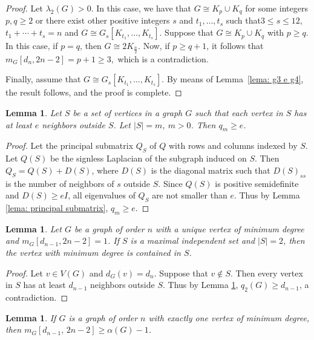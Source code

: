 \documentclass[preprint,12pt]{elsarticle}
\newtheorem{lemma}[theorem]{Lemma}
\begin{document}
\begin{proof}
Let $\lambda_2 (G) > 0$. In this case, we have that $G \cong K_p \cup K_q$ for some integers $p, q \geq 2$ or there exist other positive integers $s$ and $t_1, \ldots, t_s$ such that\linebreak $3 \leq s \leq 12$, $t_1 + \cdots + t_s = n$ and $G \cong G_s[K_{t_1}, \ldots, K_{t_s}]$. Suppose that $G \cong K_p \cup K_q$ with $p \geq q$. In this case, if $p = q$, then $G \cong 2K_{\frac{n}{2}}$. Now, if $p \geq q + 1$, it follows that $m_G[d_n, 2n - 2] = p + 1 \geq 3,$ which is a contradiction.

Finally, assume that $G \cong G_s[K_{t_1}, \ldots, K_{t_s}]$. By means of Lemma~\ref{lema: g3 e g4}, the result follows, and the proof is complete.
\end{proof}


\begin{lemma}\label{e} 
Let $S$ be a set of vertices in a graph $G$ such that each vertex in $S$ has at least $e$ neighbors outside $S$. Let $\left| S \right| = m$, $m > 0$. Then ${q_m} \ge e$.
\end{lemma}
\begin{proof}
Let the principal submatrix ${Q_S}$ of $Q$ with rows and columns indexed by $S$. Let $Q(S)$ be the signless Laplacian of the subgraph induced on $S$. Then ${Q_S} = Q(S) + {D(S)}$, where ${D(S)}$ is the diagonal matrix such that $D{(S)_{ss}}$ is the number of neighbors of $s$ outside $S$. Since $Q(S)$ is positive semidefinite and $D(S) \ge eI$, all eigenvalues of ${Q_S}$ are not smaller than $e$. Thus by Lemma \ref{lema: principal submatrix}, ${q_m} \ge e$.
\end{proof}
\begin{lemma}\label{uniq vertex of min}
 Let $G$ be a graph of order $n$ with a unique vertex of minimum degree and $m_{G}[d_{n-1}, 2n-2] = 1$. If $S$ is a maximal independent set and $|S|= 2$, then the vertex with minimum degree is contained in $S$.
\end{lemma}

\begin{proof}
 Let ${v} \in V(G)$ and ${d_G}(v) = {d_n}$. Suppose that $v \notin S$. Then every vertex in $S$ has at least ${d_{n - 1}}$ neighbors outside $S$. Thus by Lemma \ref{e}, ${q_2}(G) \ge {d_{n - 1}}$, a contradiction.
\end{proof}

\begin{lemma}\label{alpha (G) - 1}
 If $G$ is a graph of order $n$ with exactly one vertex of minimum degree, then ${m_G}\left[ {{d_{n - 1}},\,2n - 2} \right] \ge \alpha (G) - 1$.
\end{lemma}
\end{document}
